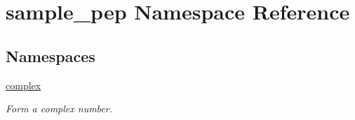 \hypertarget{namespacesample__pep}{\section{sample\-\_\-pep Namespace Reference}
\label{namespacesample__pep}
}
\subsection*{Namespaces}
\begin{DoxyCompactItemize}
\item 
\hyperlink{namespacesample__pep_1_1complex}{complex}
\begin{DoxyCompactList}\small\item\em Form a complex number. \end{DoxyCompactList}\end{DoxyCompactItemize}
